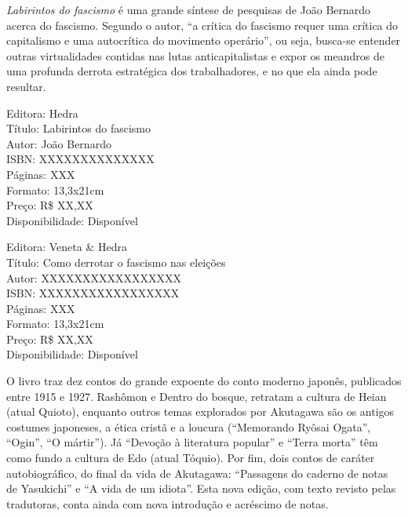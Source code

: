\pagestyle{hedra}
\label{hedra}



\noindent{}\textit{Labirintos do fascismo} é uma grande síntese de pesquisas de João Bernardo acerca do fascismo.
Segundo o autor, ``a crítica do fascismo requer uma crítica do capitalismo e uma autocrítica do movimento operário'', ou
seja, busca-se entender outras virtualidades contidas nas lutas anticapitalistas e expor os meandros de uma profunda derrota estratégica dos trabalhadores, e no que ela ainda pode resultar. %

\begin{ficha}
Editora: Hedra\\
Título: Labirintos do fascismo\\
Autor: João Bernardo\\ 
ISBN: XXXXXXXXXXXXXX\\
Páginas: XXX\\
Formato: 13,3x21cm\\
Preço: R\$ XX,XX\\
Disponibilidade: Disponível
\end{ficha}

\pagebreak


\noindent{}\lipsum[2]

\begin{ficha}
Editora: Veneta \& Hedra\\
Título: Como derrotar o fascismo nas eleições\\
Autor: XXXXXXXXXXXXXXXXX\\ 
ISBN: XXXXXXXXXXXXXXXXX\\
Páginas: XXX\\
Formato: 13,3x21cm\\
Preço: R\$ XX,XX\\
Disponibilidade: Disponível
\end{ficha}


\pagebreak


\noindent{}O livro traz dez contos do grande expoente do conto moderno japonês, publicados entre 1915 e 1927. Rashômon e Dentro do bosque, retratam a cultura de Heian (atual Quioto), enquanto outros temas explorados por Akutagawa são os antigos costumes japoneses, a ética cristã e a loucura (``Memorando Ryôsai Ogata'', ``Ogin'', ``O mártir''). Já ``Devoção à literatura popular'' e ``Terra morta'' têm como fundo a cultura de Edo (atual Tóquio). Por fim, dois contos de caráter autobiográfico, do final da vida de Akutagawa: ``Passagens do caderno de notas de Yasukichi'' e ``A vida de um idiota''. Esta nova edição, com texto revisto pelas tradutoras, conta ainda com nova introdução e acréscimo de notas.

